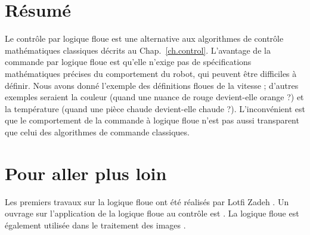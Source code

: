 \section{Résumé}

Le contrôle par logique floue est une alternative aux algorithmes de contrôle mathématiques classiques décrits au Chap.~\ref{ch.control}. L'avantage de la commande par logique floue est qu'elle n'exige pas de spécifications mathématiques précises du comportement du robot, qui peuvent être difficiles à définir. Nous avons donné l'exemple des définitions floues de la vitesse ; d'autres exemples seraient la couleur (quand une nuance de rouge devient-elle orange ?) et la température (quand une pièce chaude devient-elle chaude ?). L'inconvénient est que le comportement de la commande à logique floue n'est pas aussi transparent que celui des algorithmes de commande classiques.

\section{Pour aller plus loin}

Les premiers travaux sur la logique floue ont été réalisés par Lotfi Zadeh \cite{zadeh}. Un ouvrage sur l'application de la logique floue au contrôle est \cite{passino}.  La logique floue est également utilisée dans le traitement des images \cite[Sect.~3.8]{GW}.
